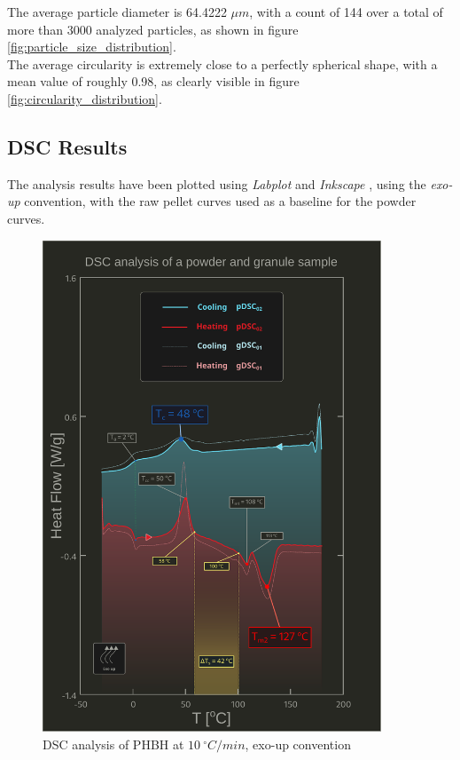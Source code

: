 \documentclass{article}
\begin{document}
      The average particle diameter is 64.4222 $\mu m$, with a count of 144 over a total of more 
      than 3000 analyzed particles, as shown in figure \ref{fig:particle_size_distribution}. \\ 
  
      The average circularity is extremely close to a perfectly spherical shape, with a 
      mean value of roughly 0.98, as clearly visible in figure \ref{fig:circularity_distribution}. \\ 

      \clearpage

    \subsection{DSC Results\label{DSC_results}}

    The analysis results have been plotted using \textit{Labplot} \autocites{Labplot} 
    and \textit{Inkscape} \autocites{Inkscape},
    using the \textit{exo-up} convention, with the raw pellet curves used as a baseline for the powder curves. \\
        \begin{figure}[h!]
            \includegraphics[width=0.9\textwidth]{Pictures/Thermal_analysis_plots/DSC_alberto.pdf}
            \caption{DSC analysis of PHBH at $10 \ ^{\circ}C/min$, exo-up convention}
            \label{fig:DSC_10Cmin}
        \end{figure}
\end{document}
